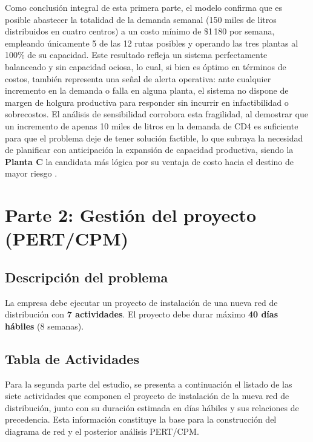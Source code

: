 \documentclass[12pt,a4paper]{article}
\begin{document}
Como conclusi\'{o}n integral de esta primera parte, el modelo confirma que es posible abastecer 
la totalidad de la demanda semanal (150 miles de litros distribuidos en cuatro centros) a un costo 
m\'{i}nimo de \$1\,180 por semana, empleando \'{u}nicamente 5 de las 12 rutas posibles y operando 
las tres plantas al 100\% de su capacidad. Este resultado refleja un sistema perfectamente balanceado 
y sin capacidad ociosa, lo cual, si bien es \'{o}ptimo en t\'{e}rminos de costos, tambi\'{e}n 
representa una se\~{n}al de alerta operativa: ante cualquier incremento en la demanda o falla en 
alguna planta, el sistema no dispone de margen de holgura productiva para responder sin incurrir 
en infactibilidad o sobrecostos. El an\'{a}lisis de sensibilidad corrobora esta 
fragilidad, al demostrar que un incremento de apenas 10 miles de litros en la demanda de CD4 es 
suficiente para que el problema deje de tener soluci\'{o}n factible, lo que subraya la necesidad 
de planificar con anticipaci\'{o}n la expansi\'{o}n de capacidad productiva, siendo la 
\textbf{Planta C} la candidata m\'{a}s l\'{o}gica por su ventaja de costo hacia el destino 
de mayor riesgo \cite{winston2005}.

\newpage


\section{Parte 2: Gesti\'{o}n del proyecto (PERT/CPM)}

\subsection{Descripci\'{o}n del problema}

La empresa debe ejecutar un proyecto de instalaci\'{o}n de una nueva red de
distribuci\'{o}n con \textbf{7 actividades}. El proyecto debe durar 
m\'{a}ximo \textbf{40 d\'{i}as h\'{a}biles} (8 semanas).

\subsection{Tabla de Actividades}

Para la segunda parte del estudio, se presenta a continuaci\'{o}n el listado de las siete 
actividades que componen el proyecto de instalaci\'{o}n de la nueva red de distribuci\'{o}n, 
junto con su duraci\'{o}n estimada en d\'{i}as h\'{a}biles y sus relaciones de precedencia. 
Esta informaci\'{o}n constituye la base para la construcci\'{o}n del diagrama 
de red y el posterior an\'{a}lisis PERT/CPM.
\end{document}
